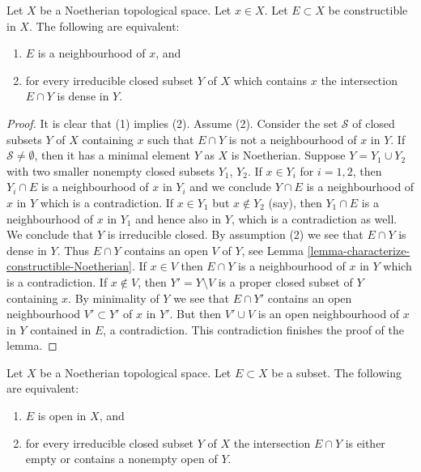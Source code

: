 \begin{lemma}
\label{lemma-constructible-neighbourhood-Noetherian}
Let $X$ be a Noetherian topological space.
Let $x \in X$.
Let $E \subset X$ be constructible in $X$.
The following are equivalent:
\begin{enumerate}
\item $E$ is a neighbourhood of $x$, and
\item for every irreducible closed subset $Y$ of $X$ which contains
$x$ the intersection $E \cap Y$ is dense in $Y$.
\end{enumerate}
\end{lemma}

\begin{proof}
It is clear that (1) implies (2). Assume (2).
Consider the set $\mathcal{S}$ of closed subsets $Y$ of $X$ containing $x$
such that $E \cap Y$ is not a neighbourhood of $x$ in $Y$.
If $\mathcal{S} \not = \emptyset$, then it has a minimal element $Y$
as $X$ is Noetherian. Suppose $Y = Y_1 \cup Y_2$ with two smaller nonempty
closed subsets $Y_1$, $Y_2$. If $x \in Y_i$ for $i = 1, 2$, then $Y_i \cap E$
is a neighbourhood of $x$ in $Y_i$ and we conclude $Y \cap E$ is a
neighbourhood of $x$ in $Y$ which is a contradiction. If $x \in Y_1$ but
$x \not\in Y_2$ (say), then $Y_1 \cap E$ is a neighbourhood of $x$ in
$Y_1$ and hence also in $Y$, which is a contradiction as well.
We conclude that $Y$ is irreducible closed. By assumption (2) we see that
$E \cap Y$ is dense in $Y$. Thus $E \cap Y$ contains an open $V$ of $Y$, see
Lemma \ref{lemma-characterize-constructible-Noetherian}.
If $x \in V$ then $E \cap Y$ is a neighbourhood of $x$ in $Y$ which
is a contradiction. If $x \not \in V$, then $Y' = Y \setminus V$ is a
proper closed subset of $Y$ containing $x$. By minimality of $Y$
we see that $E \cap Y'$ contains an open neighbourhood $V' \subset Y'$
of $x$ in $Y'$. But then $V' \cup V$ is an open neighbourhood of $x$
in $Y$ contained in $E$, a contradiction.
This contradiction finishes the proof of the lemma.
\end{proof}

\begin{lemma}
\label{lemma-characterize-open-Noetherian}
Let $X$ be a Noetherian topological space.
Let $E \subset X$ be a subset.
The following are equivalent:
\begin{enumerate}
\item $E$ is open in $X$, and
\item for every irreducible closed subset $Y$ of $X$
the intersection $E \cap Y$ is either empty or
contains a nonempty open of $Y$.
\end{enumerate}
\end{lemma}

